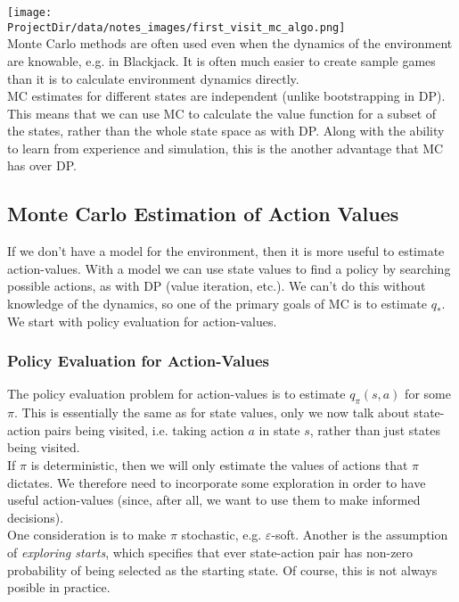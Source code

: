 \texttt{[image: \\ProjectDir/data/notes\_images/first\_visit\_mc\_algo.png]} \\ 

Monte Carlo methods are often used even when the dynamics of the environment are knowable, e.g. in Blackjack. It is often much easier to create sample games than it is to calculate environment dynamics directly.\\

MC estimates for different states are independent (unlike bootstrapping in DP). This means that we can use MC to calculate the value function for a subset of the states, rather than the whole state space as with DP. Along with the ability to learn from experience and simulation, this is the another advantage that MC has over DP.

\subsection{Monte Carlo Estimation of Action Values}
If we don't have a model for the environment, then it is more useful to estimate action-values. With a model we can use state values to find a policy by searching possible actions, as with DP (value iteration, etc.). We can't do this without knowledge of the dynamics, so one of the primary goals of MC is to estimate $q_*$. We start with policy evaluation for action-values.

\subsubsection*{Policy Evaluation for Action-Values}
The policy evaluation problem for action-values is to estimate $q_\pi(s, a)$ for some $\pi$. This is essentially the same as for state values, only we now talk about state-action pairs being visited, i.e. taking action $a$ in state $s$, rather than just states being visited.\\

If $\pi$ is deterministic, then we will only estimate the values of actions that $\pi$ dictates. We therefore need to incorporate some exploration in order to have useful action-values (since, after all, we want to use them to make informed decisions).\\

One consideration is to make $\pi$ stochastic, e.g. $\varepsilon$-soft. Another is the assumption of \emph{exploring starts}, which specifies that ever state-action pair has non-zero probability of being selected as the starting state. Of course, this is not always posible in practice.\\

